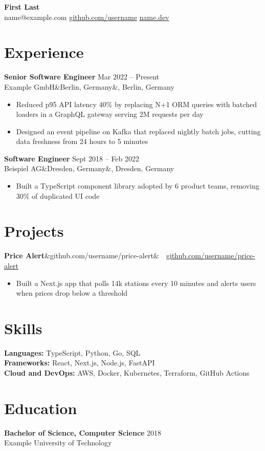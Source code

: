 \documentclass[11pt,letterpaper]{article} %
\newcommand{\entry}[4]{%
  \textbf{#1} \hfill #2\\
  #3\ifx&#4&\else, #4\fi\par\vspace{0.2ex}}
\newcommand{\project}[2]{%
  \textbf{#1}\ifx&#2&\else\ \textbar\ \href{https://#2}{#2}\fi\par\vspace{0.2ex}}
\newcommand{\edu}[3]{\textbf{#1} \hfill #2\\ #3\par}
\begin{document}
\begin{center}
  {\LARGE\textbf{First Last}}\\[0.6ex]
  name@example.com \quad
  \href{https://github.com/username}{github.com/username} \quad
  \href{https://name.dev}{name.dev}
\end{center}


\section{Experience}

\entry{Senior Software Engineer}{Mar 2022 -- Present}{Example GmbH}{Berlin, Germany}
\begin{itemize}
  \item Reduced p95 API latency 40\% by replacing N+1 ORM queries with batched loaders in a GraphQL gateway serving 2M requests per day
  \item Designed an event pipeline on Kafka that replaced nightly batch jobs, cutting data freshness from 24 hours to 5 minutes
\end{itemize}
\vspace{0.6ex}

\entry{Software Engineer}{Sept 2018 -- Feb 2022}{Beispiel AG}{Dresden, Germany}
\begin{itemize}
  \item Built a TypeScript component library adopted by 6 product teams, removing 30\% of duplicated UI code
\end{itemize}

\section{Projects}

\project{Price Alert}{github.com/username/price-alert}
\begin{itemize}
  \item Built a Next.js app that polls 14k stations every 10 minutes and alerts users when prices drop below a threshold
\end{itemize}

\section{Skills}
\textbf{Languages:} TypeScript, Python, Go, SQL\\
\textbf{Frameworks:} React, Next.js, Node.js, FastAPI\\
\textbf{Cloud and DevOps:} AWS, Docker, Kubernetes, Terraform, GitHub Actions

\section{Education}
\edu{Bachelor of Science, Computer Science}{2018}{Example University of Technology}
\end{document}
